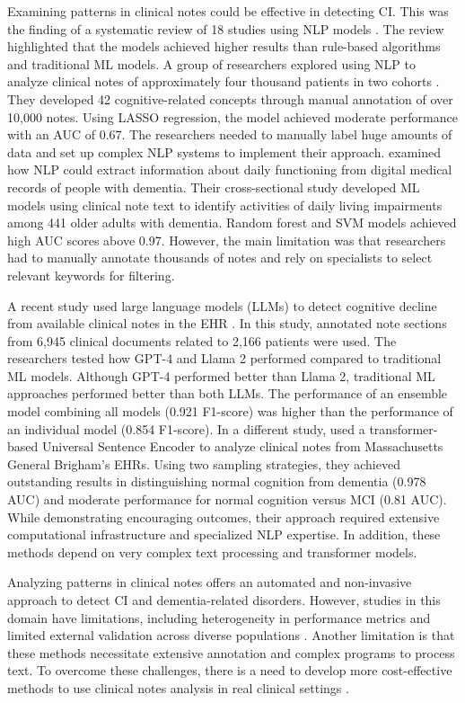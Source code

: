Examining patterns in clinical notes could be effective in detecting CI. This was the finding of a systematic review of 18 studies using NLP models \cite{Shankar2025Natural}. The review highlighted that the models achieved higher results than rule-based algorithms and traditional ML models. A group of researchers explored using NLP to analyze clinical notes of approximately four thousand patients in two cohorts \cite{Penfold2022Development}. They developed 42 cognitive-related concepts through manual annotation of over 10,000 notes. Using \acrshort{LASSO} regression, the model achieved moderate performance with an AUC of 0.67. The researchers needed to manually label huge amounts of data and set up complex NLP systems to implement their approach.  examined how NLP could extract information about daily functioning from digital medical records of people with dementia. Their cross-sectional study developed ML models using clinical note text to identify activities of daily living impairments among 441 older adults with dementia. Random forest and SVM models achieved high AUC scores above 0.97. However, the main limitation was that researchers had to manually annotate thousands of notes and rely on specialists to select relevant keywords for filtering.

A recent study used large language models (\acrshort{LLMs}) to detect cognitive decline from available clinical notes in the EHR \cite{Du2024Enhancing}. In this study, annotated note sections from 6,945 clinical documents related to 2,166 patients were used. The researchers tested how GPT-4 and Llama 2 performed compared to traditional ML models. Although GPT-4 performed better than Llama 2, traditional ML approaches performed better than both LLMs. The performance of an ensemble model combining all models (0.921 F1-score) was higher than the performance of an individual model (0.854 F1-score). In a different study,  used a transformer-based Universal Sentence Encoder to analyze clinical notes from Massachusetts General Brigham's EHRs. Using two sampling strategies, they achieved outstanding results in distinguishing normal cognition from dementia (0.978 AUC) and moderate performance for normal cognition versus MCI (0.81 AUC). While demonstrating encouraging outcomes, their approach required extensive computational infrastructure and specialized NLP expertise. In addition, these methods depend on very complex text processing and transformer models.

Analyzing patterns in clinical notes offers an automated and non-invasive approach to detect CI and dementia-related disorders. However, studies in this domain have limitations, including heterogeneity in performance metrics and limited external validation across diverse populations \cite{Shankar2025Natural}. Another limitation is that these methods necessitate extensive annotation and complex programs to process text. To overcome these challenges, there is a need to develop more cost-effective methods to use clinical notes analysis in real clinical settings \cite{Shankar2025Natural}.

